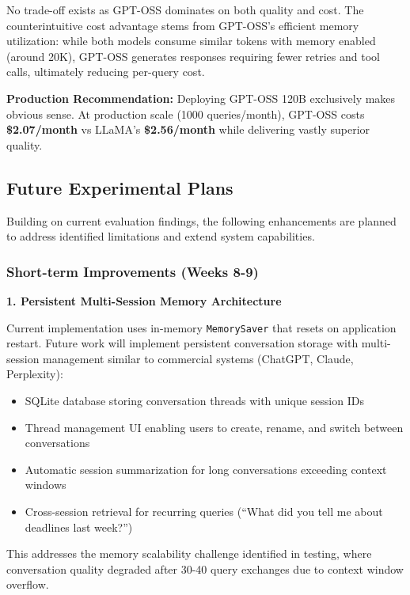 \documentclass{article}
\begin{document}
No trade-off exists as GPT-OSS dominates on both quality and cost. The counterintuitive cost advantage stems from GPT-OSS's efficient memory utilization: while both models consume similar tokens with memory enabled (around 20K), GPT-OSS generates responses requiring fewer retries and tool calls, ultimately reducing per-query cost.

\textbf{Production Recommendation:} Deploying GPT-OSS 120B exclusively makes obvious sense. At production scale (1000 queries/month), GPT-OSS costs \textbf{\$2.07/month} vs LLaMA's \textbf{\$2.56/month} while delivering vastly superior quality.


\subsection{Future Experimental Plans}

Building on current evaluation findings, the following enhancements are planned to address identified limitations and extend system capabilities.

\subsubsection{Short-term Improvements (Weeks 8-9)}

\textbf{1. Persistent Multi-Session Memory Architecture}

Current implementation uses in-memory \texttt{MemorySaver} that resets on application restart. Future work will implement persistent conversation storage with multi-session management similar to commercial systems (ChatGPT, Claude, Perplexity):

\begin{itemize}
    \item SQLite database storing conversation threads with unique session IDs
    \item Thread management UI enabling users to create, rename, and switch between conversations
    \item Automatic session summarization for long conversations exceeding context windows
    \item Cross-session retrieval for recurring queries (``What did you tell me about deadlines last week?'')
\end{itemize}

This addresses the memory scalability challenge identified in testing, where conversation quality degraded after 30-40 query exchanges due to context window overflow.
\end{document}
